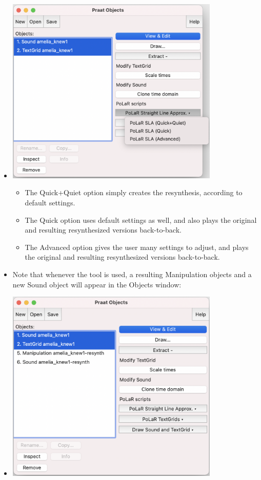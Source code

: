 \documentclass[11pt, twoside]{memoir}
\begin{document}
\begin{itemize}
\begin{itemize}
		\item[] \includegraphics[width=4in]{Practical-Plugin-4-Objects-Window-SLA.png}
		\begin{itemize}
			\item The Quick+Quiet option simply creates the resynthesis, according to default settings.
			\item The Quick option uses default settings as well, and also plays the original and resulting resynthesized versions back-to-back.
			\item The Advanced option gives the user many settings to adjust, and plays the original and resulting resynthesized versions back-to-back.
		\end{itemize}
		\item Note that whenever the tool is used, a resulting Manipulation objects and a new Sound object will appear in the Objects window:
		\item[] \includegraphics[width=4in]{Practical-Plugin-5-Objects-Window.png}\\

\end{itemize}
\end{itemize}
\end{document}
